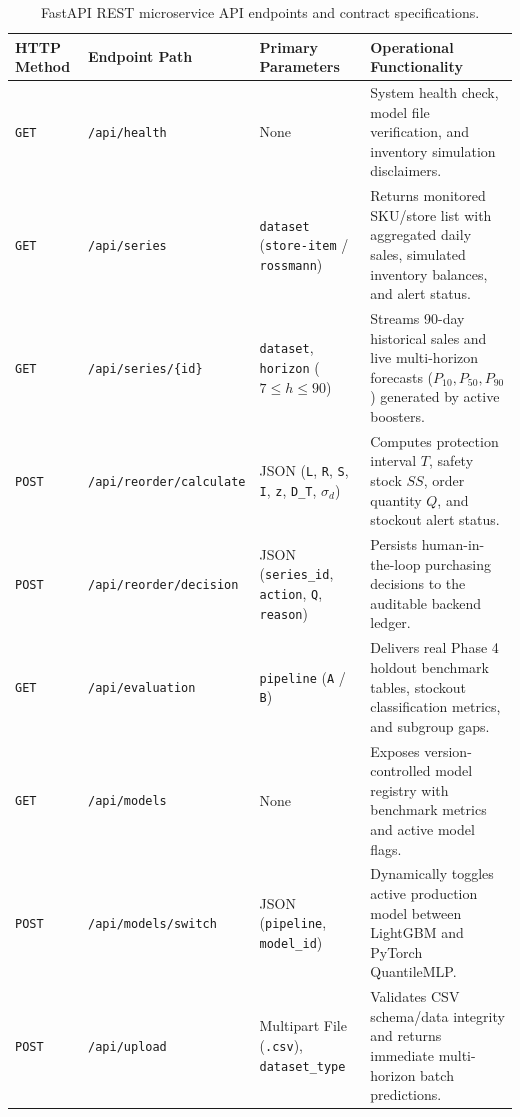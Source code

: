 \documentclass[11pt,a4paper]{article}
\begin{document}
\begin{table}[H]
    \centering
    \small
    \begin{tabular}{lllp{6.8cm}}
        \toprule
        \textbf{HTTP Method} & \textbf{Endpoint Path} & \textbf{Primary Parameters} & \textbf{Operational Functionality} \\
        \midrule
        \texttt{GET} & \texttt{/api/health} & None & System health check, model file verification, and inventory simulation disclaimers. \\
        \texttt{GET} & \texttt{/api/series} & \texttt{dataset} (\texttt{store-item} / \texttt{rossmann}) & Returns monitored SKU/store list with aggregated daily sales, simulated inventory balances, and alert status. \\
        \texttt{GET} & \texttt{/api/series/\{id\}} & \texttt{dataset}, \texttt{horizon} ($7 \le h \le 90$) & Streams 90-day historical sales and live multi-horizon forecasts ($P_{10}, P_{50}, P_{90}$) generated by active boosters. \\
        \texttt{POST} & \texttt{/api/reorder/calculate} & JSON (\texttt{L}, \texttt{R}, \texttt{S}, \texttt{I}, \texttt{z}, \texttt{D\_T}, $\sigma_d$) & Computes protection interval $T$, safety stock $SS$, order quantity $Q$, and stockout alert status. \\
        \texttt{POST} & \texttt{/api/reorder/decision} & JSON (\texttt{series\_id}, \texttt{action}, \texttt{Q}, \texttt{reason}) & Persists human-in-the-loop purchasing decisions to the auditable backend ledger. \\
        \texttt{GET} & \texttt{/api/evaluation} & \texttt{pipeline} (\texttt{A} / \texttt{B}) & Delivers real Phase 4 holdout benchmark tables, stockout classification metrics, and subgroup gaps. \\
        \texttt{GET} & \texttt{/api/models} & None & Exposes version-controlled model registry with benchmark metrics and active model flags. \\
        \texttt{POST} & \texttt{/api/models/switch} & JSON (\texttt{pipeline}, \texttt{model\_id}) & Dynamically toggles active production model between LightGBM and PyTorch QuantileMLP. \\
        \texttt{POST} & \texttt{/api/upload} & Multipart File (\texttt{.csv}), \texttt{dataset\_type} & Validates CSV schema/data integrity and returns immediate multi-horizon batch predictions. \\
        \bottomrule
    \end{tabular}
    \caption{FastAPI REST microservice API endpoints and contract specifications.}
    \label{tab:api_endpoints}
\end{table}
\end{document}
